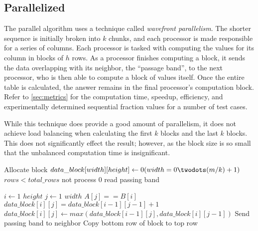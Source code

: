 \subsection{Parallelized}
The parallel algorithm uses a technique called \textit{wavefront
  parallelism}. The shorter sequence is initially broken into $ k $
chunks, and each processor is made responsible for a series of
columns. Each processor is tasked with computing the values for its
column in blocks of $h$ rows. As a processor finishes computing a
block, it sends the data overlapping with its neighbor, the ``passage
band'', to the next processor, who is then able to compute a block of
values itself. Once the entire table is calculated, the answer remains
in the final processor's computation block. Refer to \ref{sec:metrics}
for the computation time, speedup, efficiency, and experimentally
determined sequential fraction values for a number of test cases.

While this technique does provide a good amount of parallelism, it
does not achieve load balancing when calculating the first $ k $
blocks and the last $ k $ blocks. This does not significantly effect
the result; however, as the block size is so small that the unbalanced
computation time is insignificant.

\begin{codebox}
\li	\Comment Allocate block
\li $data\_block[width][height] \gets 0 (width=0 \twodots (m/k)+1)$
\li \While $rows < total\_rows$
\li \Do
\li		\If not process $0$
\li		\Then
\li			\Comment read passing band
		\End

\li		\For $i \gets 1$ \To $height$
\li		\Do
\li			\For $j \gets 1$ \To $width$
\li				\If $A[j] == B[i]$
\li				\Then
\li					$data\_block[i][j] = data\_block[i-1][j-1] + 1$
\li				\Else
\li					$data\_block[i][j] \gets max(data\_block[i-1][j], data\_block[i][j-1])$
				\End
			\End
		\End
\li		\Comment Send passing band to neighbor
\li 	\Comment Copy bottom row of block to top row
\li \End
\end{codebox}


